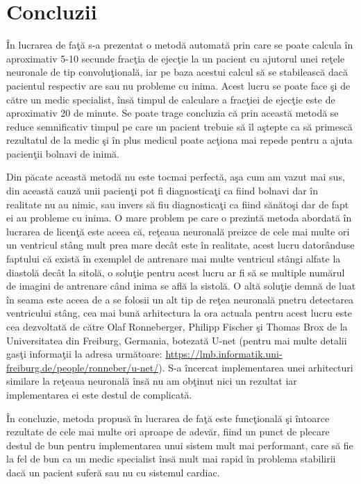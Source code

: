 \chapter{Concluzii}

\^{I}n lucrarea de fa\c{t}\u{a} s-a prezentat o metod\u{a} automat\u{a} prin care se poate calcula \^{i}n aproximativ 5-10 secunde frac\c{t}ia de ejec\c{t}ie la un pacient cu ajutorul unei re\c{t}ele neuronale de tip convolu\c{t}ional\u{a}, iar pe baza acestui calcul s\u{a} se stabileasc\u{a} dac\u{a} pacientul respectiv are sau nu probleme cu inima. Acest lucru se poate face \c{s}i de c\u{a}tre un medic specialist, \^{i}ns\u{a} timpul de calculare a frac\c{t}iei de ejec\c{t}ie este de aproximativ 20 de minute. Se poate trage concluzia c\u{a} prin aceast\u{a} metod\u{a} se reduce semnificativ timpul pe care un pacient trebuie s\u{a} \^{i}l a\c{s}tepte ca s\u{a} primesc\u{a} rezultatul de la medic \c{s}i \^{i}n plus medicul poate ac\c{t}iona mai repede pentru a ajuta pacien\c{t}ii bolnavi de inim\u{a}.

\par

Din p\u{a}cate aceast\u{a} metod\u{a} nu este tocmai perfect\u{a}, a\c{s}a cum am vazut mai sus, din aceast\u{a} cauz\u{a} unii pacien\c{t}i pot fi diagnostica\c{t}i ca fiind bolnavi dar \^{i}n realitate nu au nimic, sau invers s\u{a} fiu diagnostica\c{t}i ca fiind s\u{a}n\u{a}to\c{s}i dar de fapt ei au probleme cu inima. O mare problem pe care o prezint\u{a} metoda abordat\u{a} \^{i}n lucrarea de licen\c{t}\u{a} este aceea c\u{a}, re\c{t}eaua neuronal\u{a} preizce de cele mai multe ori un ventricul st\^{a}ng mult prea mare dec\^{a}t este \^{i}n realitate, acest lucru dator\^{a}nduse faptului c\u{a} exist\u{a} \^{i}n exemplel de antrenare mai multe ventricul st\^{a}ngi alfate la diastol\u{a} dec\^{a}t la sitol\u{a}, o solu\c{t}ie pentru acest lucru ar fi s\u{a} se multiple num\u{a}rul de imagini de antrenare c\^{a}nd inima se afl\u{a} la sistol\u{a}. O alt\u{a} solu\c{t}ie demn\u{a} de luat \^{i}n seama este aceea de a se folosii un alt tip de re\c{t}ea neuronal\u{a} pnetru detectarea ventricului st\^{a}ng, cea mai bun\u{a} arhitectura la ora actuala pentru acest lucru este cea dezvoltat\u{a} de c\u{a}tre Olaf Ronneberger, Philipp Fischer \c{s}i Thomas Brox de la Universitatea din Freiburg, Germania, botezat\u{a} U-net (pentru mai multe detalii gas\c{t}i informa\c{t}ii la adresa urm\u{a}toare: \url{https://lmb.informatik.uni-freiburg.de/people/ronneber/u-net/}). S-a \^{i}ncercat implementarea unei arhitecturi similare la re\c{t}eaua neuronal\u{a} \^{i}ns\u{a} nu am ob\c{t}inut nici un rezultat iar implementarea ei este destul de complicat\u{a}.

\par

\^{I}n concluzie, metoda propus\u{a} \^{i}n lucrarea de fa\c{t}\u{a} este func\c{t}ional\u{a} \c{s}i \^{i}ntoarce rezultate de cele mai multe ori aproape de adev\u{a}r, fiind un punct de plecare destul de bun pentru implementarea unui sistem mult mai performant, care s\u{a} fie la fel de bun ca un medic specialist \^{i}ns\u{a} mult mai rapid \^{i}n problema stabilirii dac\u{a} un pacient sufer\u{a} sau nu cu sistemul cardiac. 